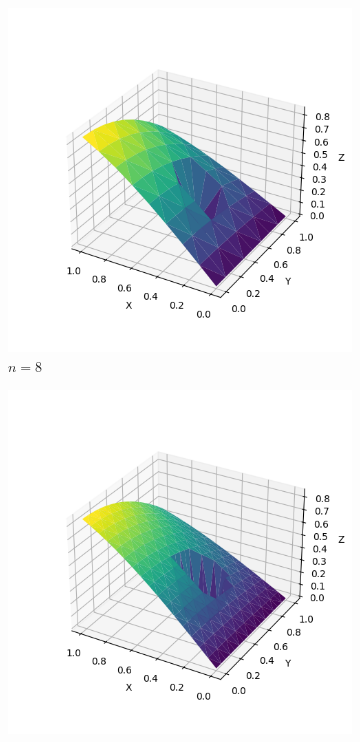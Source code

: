 \documentclass[lang=cn,a4paper,newtx,bibend=bibtex]{elegantpaper}
\begin{document}
\begin{figure}[H]
  \centering
  \begin{subfigure}[b]{0.18\textwidth}
      \includegraphics[width=\textwidth]{../../res_bac/res-[data|2-Neumann-irregular-a8].png}
      \caption{$n =  8$}
  \end{subfigure}
  \hfill
  \begin{subfigure}[b]{0.18\textwidth}
      \includegraphics[width=\textwidth]{../../res_bac/res-[data|2-Neumann-irregular-b16].png}

\end{subfigure}
\end{figure}
\end{document}
